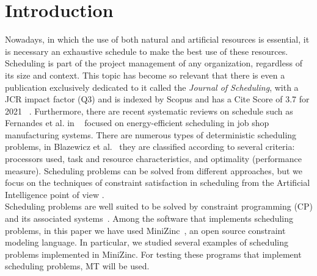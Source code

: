 \section{Introduction}\label{sec1}

Nowadays, in which the use of both natural and artificial resources is essential,
it is necessary an exhaustive schedule to make the best use of these resources. Scheduling is part of the project management of any organization, regardless of its size and context.
This topic has become so relevant that there is even a publication exclusively dedicated to it called the \emph{Journal of Scheduling}, with a JCR impact factor (Q3) and is indexed by Scopus and has a Cite Score of 3.7 for 2021 ~\cite{JournalSchedul2003}.
Furthermore, there are recent systematic reviews on schedule such as Fernandes et al. in ~\cite{fernandes2022energy} focused on energy-efficient scheduling in job shop manufacturing
systems. There are numerous types of deterministic scheduling problems, in Blazewicz et al.~\cite{blazewicz2019handbook} they are classified according to several criteria: processors used, task and resource characteristics, and optimality (performance measure).
Scheduling problems can be solved from different approaches, but we focus on the techniques of constraint satisfaction in scheduling from the Artificial Intelligence point of view \cite{bsr10}.\\


Scheduling problems are well suited to be solved by constraint programming (CP) and its associated systems~\cite{CANIZARES2022}. 
Among the software that implements scheduling problems, 
in this paper we have used MiniZinc~\cite{ nethercote2007minizinc}, an open source constraint modeling language. In particular, we studied several examples of scheduling problems implemented in MiniZinc. 
For testing these programs that implement scheduling problems, MT will be used.\\

